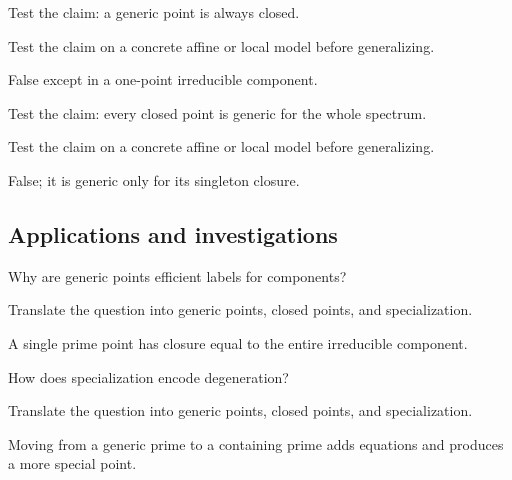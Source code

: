 \begin{exercise}\label{exr:vi09-expand-11}
Test the claim: a generic point is always closed.
\end{exercise}
\begin{hint}
Test the claim on a concrete affine or local model before generalizing.
\end{hint}
\begin{solution}
False except in a one-point irreducible component.
\end{solution}

\begin{exercise}\label{exr:vi09-expand-12}
Test the claim: every closed point is generic for the whole spectrum.
\end{exercise}
\begin{hint}
Test the claim on a concrete affine or local model before generalizing.
\end{hint}
\begin{solution}
False; it is generic only for its singleton closure.
\end{solution}

\subsection*{Applications and investigations}

\begin{exercise}\label{exr:vi09-expand-13}
Why are generic points efficient labels for components?
\end{exercise}
\begin{hint}
Translate the question into generic points, closed points, and specialization.
\end{hint}
\begin{solution}
A single prime point has closure equal to the entire irreducible component.
\end{solution}

\begin{exercise}[Degeneration]\label{exr:vi09-expand-14}
How does specialization encode degeneration?
\end{exercise}
\begin{hint}
Translate the question into generic points, closed points, and specialization.
\end{hint}
\begin{solution}
Moving from a generic prime to a containing prime adds equations and produces a more special point.
\end{solution}

